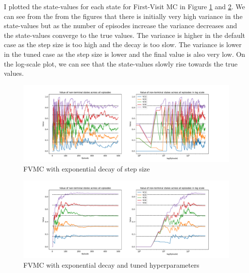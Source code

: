 \begin{enumerate}
    I plotted the state-values for each state for First-Visit MC in Figure \ref{fig:default_fvmc} and \ref{fig:tuned_fvmc}. We can see from the from the figures that there is initially very high variance in the state-values but as the number of episodes increase the variance decreases and the state-values converge to the true values. The variance is higher in the default case as the step size is too high and the decay is too slow. The variance is lower in the tuned case as the step size is lower and the final value is also very low. On the log-scale plot, we can see that the state-values slowly rise towards the true values.

    \begin{figure}[h]
        \centering
        \includegraphics[width=\textwidth]{images/mc_td/first_visit_exponential_0.5_0.01_episode_values.pdf}
        \caption{FVMC with exponential decay of step size}
        \label{fig:default_fvmc}
    \end{figure}

    \begin{figure}[h]
        \centering
        \includegraphics[width=\textwidth]{images/mc_td/first_visit_exponential_0.1_0.0001_episode_values.pdf}
        \caption{FVMC with exponential decay and tuned hyperparameters}
        \label{fig:tuned_fvmc}
    \end{figure}

\end{enumerate}